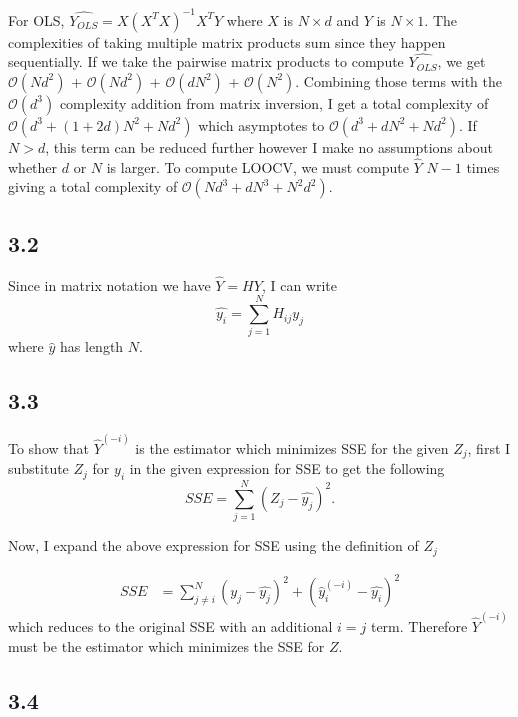 \documentclass[12pt]{amsart}
\begin{document}
For OLS, $\hat{Y_{OLS}} = X(X^T X)^{-1}X^T Y$ where $X$ is $N \times d$ and $Y$ is $N \times 1$.  The complexities of taking multiple matrix products sum since they happen sequentially.  If we take the pairwise matrix products to compute $\hat{Y_{OLS}}$, we get $\mathcal{O}(Nd^2)$ + $\mathcal{O}(Nd^2)$ + $\mathcal{O}(dN^2)$ + $\mathcal{O}(N^2)$.  Combining those terms with the $\mathcal{O}(d^3)$ complexity addition from matrix inversion, I get a total complexity of $\mathcal{O}(d^3 + (1+2d)N^2 + Nd^2)$ which asymptotes to $\mathcal{O}(d^3 + dN^2 + Nd^2)$.  If $N > d$, this term can be reduced further however I make no assumptions about whether $d$ or $N$ is larger.  To compute LOOCV, we must compute $\hat{Y}$ $N - 1$ times giving a total complexity of $\mathcal{O}(Nd^3 + dN^3 + N^2d^2)$.

\subsection*{3.2}

Since in matrix notation we have $\hat{Y} = HY$, I can write 
\begin{equation}
\hat{y_i} = \sum_{j=1}^N H_{ij}y_j
\end{equation}
where $\hat{y}$ has length $N$.

\subsection*{3.3}

To show that $\hat{Y}^{(-i)}$ is the estimator which minimizes SSE for the given $Z_j$, first I substitute $Z_j$ for $y_i$ in the given expression for SSE to get the following
\begin{equation}
SSE = \sum_{j=1}^N (Z_j - \hat{y_j})^2.
\end{equation} 

Now, I expand the above expression for SSE using the definition of $Z_j$

\begin{equation}
\begin{split}
SSE & = \sum_{j \neq i}^N (y_j - \hat{y_j})^2  + (\hat{y}_i^{(-i)} - \hat{y_i})^2
\end{split}
\end{equation}
which reduces to the original SSE with an additional $i = j$ term.  Therefore $\hat{Y}^{(-i)}$ must be the estimator which minimizes the SSE for $Z$.

\subsection*{3.4}
\end{document}
